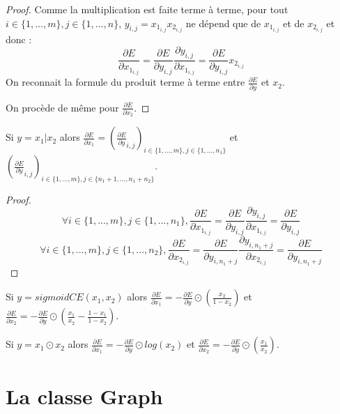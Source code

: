 \begin{proof}
Comme la multiplication est faite terme à terme, pour tout $i \in \{1, ..., m\}, j \in \{1, ..., n\}$, $y_{i, j} = x_{1_{i, j}}x_{2_{i, j}}$ ne dépend que de $x_{1_{i, j}}$ et de $x_{2_{i, j}}$ et donc :
$$
\frac{\partial E}{\partial x_{1_{i, j}}} = \frac{\partial E}{\partial y_{i, j}}\frac{\partial y_{i, j}}{\partial x_{1_{i, j}}} = \frac{\partial E}{\partial y_{i, j}}x_{2_{i, j}}
$$
On reconnait la formule du produit terme à terme entre $\frac{\partial E}{\partial y}$ et $x_2$.

On procède de même pour $\frac{\partial E}{\partial x_2}$.
\end{proof}

\begin{proposition}
Si $y = x_1 | x_2$ alors $\frac{\partial E}{\partial x_1} = (\frac{\partial E}{\partial y}_{i, j})_{i \in \{1, ..., m\}, j \in \{1, ..., n_1\}}$ et $(\frac{\partial E}{\partial y}_{i, j})_{i \in \{1, ..., m\}, j \in \{n_1+1, ..., n_1+n_2\}}$.
\end{proposition}

\begin{proof}
$$
\forall i \in \{1, ..., m\}, j \in \{1, ..., n_1\}, \frac{\partial E}{\partial x_{1_{i, j}}} = \frac{\partial E}{\partial y_{i, j}}\frac{\partial y_{i, j}}{\partial x_{1_{i, j}}} = \frac{\partial E}{\partial y_{i, j}}
$$
$$
\forall i \in \{1, ..., m\}, j \in \{1, ..., n_2\}, \frac{\partial E}{\partial x_{2_{i, j}}} = \frac{\partial E}{\partial y_{i, n_1+j}}\frac{\partial y_{i, n_1+j}}{\partial x_{2_{i, j}}} = \frac{\partial E}{\partial y_{i, n_1+j}}
$$
\end{proof}

\begin{proposition}
Si $y = sigmoidCE(x_1, x_2)$ alors $\frac{\partial E}{\partial x_1} = -\frac{\partial E}{\partial y} \odot \left(\frac{x_2}{1-x_2}\right)$ et $\frac{\partial E}{\partial x_2} = -\frac{\partial E}{\partial y} \odot \left(\frac{x_1}{x_2} - \frac{1-x_1}{1-x_2}\right)$.
\end{proposition}

\begin{proposition}
Si $y = x_1 \odot x_2$ alors $\frac{\partial E}{\partial x_1} = -\frac{\partial E}{\partial y} \odot log(x_2)$ et $\frac{\partial E}{\partial x_2} = -\frac{\partial E}{\partial y} \odot \left(\frac{x_1}{x_2}\right)$.
\end{proposition}

\section{La classe Graph}

